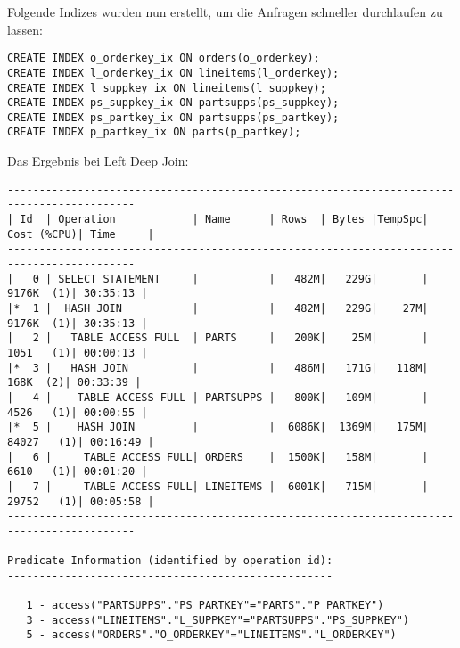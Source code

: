 \documentclass[10pt]{article}
\begin{document}
Folgende Indizes wurden nun erstellt, um die Anfragen schneller durchlaufen zu lassen:
\begin{lstlisting}[style=sql]
CREATE INDEX o_orderkey_ix ON orders(o_orderkey);
CREATE INDEX l_orderkey_ix ON lineitems(l_orderkey);
CREATE INDEX l_suppkey_ix ON lineitems(l_suppkey);
CREATE INDEX ps_suppkey_ix ON partsupps(ps_suppkey);
CREATE INDEX ps_partkey_ix ON partsupps(ps_partkey);
CREATE INDEX p_partkey_ix ON parts(p_partkey);
\end{lstlisting}
Das Ergebnis bei Left Deep Join:
\begin{lstlisting}[style=queryexecutionplan]
------------------------------------------------------------------------------------------
| Id  | Operation            | Name      | Rows  | Bytes |TempSpc| Cost (%CPU)| Time     |
------------------------------------------------------------------------------------------
|   0 | SELECT STATEMENT     |           |   482M|   229G|       |  9176K  (1)| 30:35:13 |
|*  1 |  HASH JOIN           |           |   482M|   229G|    27M|  9176K  (1)| 30:35:13 |
|   2 |   TABLE ACCESS FULL  | PARTS     |   200K|    25M|       |  1051   (1)| 00:00:13 |
|*  3 |   HASH JOIN          |           |   486M|   171G|   118M|   168K  (2)| 00:33:39 |
|   4 |    TABLE ACCESS FULL | PARTSUPPS |   800K|   109M|       |  4526   (1)| 00:00:55 |
|*  5 |    HASH JOIN         |           |  6086K|  1369M|   175M| 84027   (1)| 00:16:49 |
|   6 |     TABLE ACCESS FULL| ORDERS    |  1500K|   158M|       |  6610   (1)| 00:01:20 |
|   7 |     TABLE ACCESS FULL| LINEITEMS |  6001K|   715M|       | 29752   (1)| 00:05:58 |
------------------------------------------------------------------------------------------
 
Predicate Information (identified by operation id):
---------------------------------------------------
 
   1 - access("PARTSUPPS"."PS_PARTKEY"="PARTS"."P_PARTKEY")
   3 - access("LINEITEMS"."L_SUPPKEY"="PARTSUPPS"."PS_SUPPKEY")
   5 - access("ORDERS"."O_ORDERKEY"="LINEITEMS"."L_ORDERKEY")
\end{lstlisting}
\end{document}

